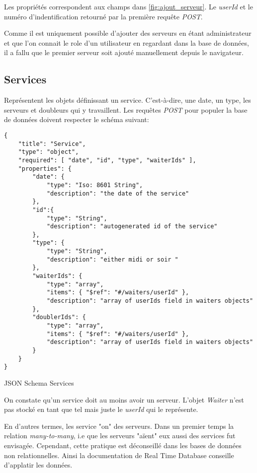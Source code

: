 Les propriétés correspondent aux champs dans \ref{fig:ajout_serveur}. Le \textit{userId} et le numéro d'indentification retourné par la première requête \textit{POST}.

Comme il est uniquement possible d'ajouter des serveurs en étant administrateur et que l'on connait le role d'un utilisateur en regardant dans la base de données, il a fallu que le premier serveur soit ajouté manuellement depuis le navigateur.
\newpage
\subsection*{Services}
Représentent les objets définissant un service. C'est-à-dire, une date, un type, les serveurs et doubleurs qui y travaillent. Les requêtes \textit{POST} pour populer la base de données doivent respecter le schéma suivant:

\begin{listing}[!h]
\begin{verbatim}
{
    "title": "Service",
    "type": "object",
    "required": [ "date", "id", "type", "waiterIds" ],
    "properties": {
        "date": {
            "type": "Iso: 8601 String",
            "description": "the date of the service"
        },
        "id":{
            "type": "String",
            "description": "autogenerated id of the service"
        },
        "type": {
            "type": "String",
            "description": "either midi or soir "
        },
        "waiterIds": {
            "type": "array",
            "items": { "$ref": "#/waiters/userId" },
            "description": "array of userIds field in waiters objects"
        },
        "doublerIds": {
            "type": "array",
            "items": { "$ref": "#/waiters/userId" },
            "description": "array of userIds field in waiters objects"
        }
    }
}
\end{verbatim}
\caption{JSON Schema Services}
\label{schema:services}
\end{listing}

On constate qu'un service doit au moins avoir un serveur. L'objet \textit{Waiter} n'est pas stocké en tant que tel mais juste le \textit{userId} qui le représente. 

En d'autres termes, les service "on" des serveurs. Dans un premier temps la relation \textit{many-to-many}, i.e que les serveurs "aïent" eux aussi des services fut envisagée. Cependant, cette pratique est déconseillé dans les bases de données non relationnelles. Ainsi la documentation de Real Time Database conseille d'applatir les données. 
\newpage
